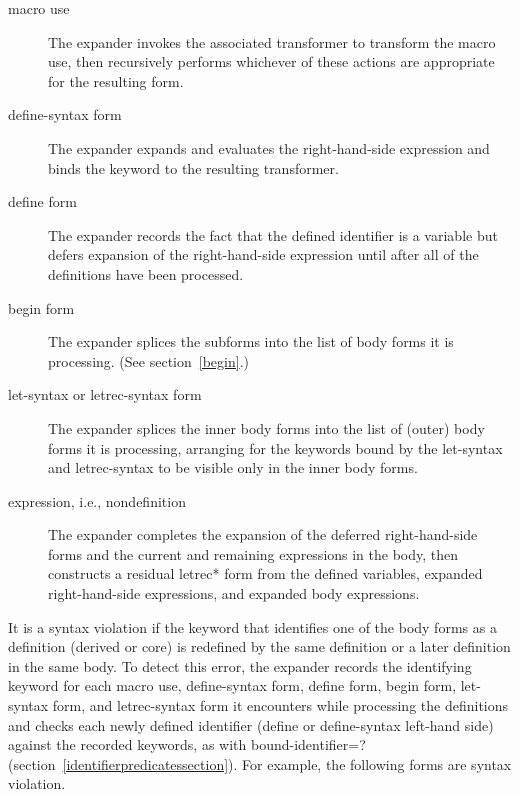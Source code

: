 \begin{description}
\item[macro use]
The expander invokes the associated transformer to transform the macro
use, then recursively performs whichever of these actions are appropriate
for the resulting form.

\item[{\cf define-syntax} form]
The expander expands and evaluates the right-hand-side expression and binds the
keyword to the resulting transformer.

\item[{\cf define} form]
The expander records the fact that the defined identifier is a variable but defers
expansion of the right-hand-side expression until after all of the
definitions have been processed.

\item[{\cf begin} form]
The expander splices the subforms into the list of body forms it is
processing.  (See section~\ref{begin}.)

\item[{\cf let-syntax} or {\cf letrec-syntax} form]
The expander splices the inner body forms into the list of (outer) body forms it is
processing, arranging for the keywords bound by the {\cf let-syntax}
and {\cf letrec-syntax} to be visible only in the inner body forms.

\item[expression, i.e., nondefinition]
The expander completes the expansion of the deferred right-hand-side forms
and the current and remaining expressions in the body, then
constructs a residual {\cf letrec*} form from the defined variables,
expanded right-hand-side expressions, and expanded body expressions.
\end{description}

It is a syntax violation
if the keyword that identifies one of the body forms
as a definition (derived or core) is redefined by the same definition or a
later definition in the same body.
To detect this error, the expander records the identifying keyword for each
macro use, {\cf define-syntax} form, {\cf define}
form, {\cf begin} form, {\cf let-syntax} form, and {\cf letrec-syntax}
form it encounters while processing the definitions and checks each
newly defined identifier ({\cf define} or {\cf define-syntax}
left-hand side) against the recorded keywords, as with
{\cf bound-identifier=?} (section~\ref{identifierpredicatessection}).
For example, the following forms are syntax violation.

